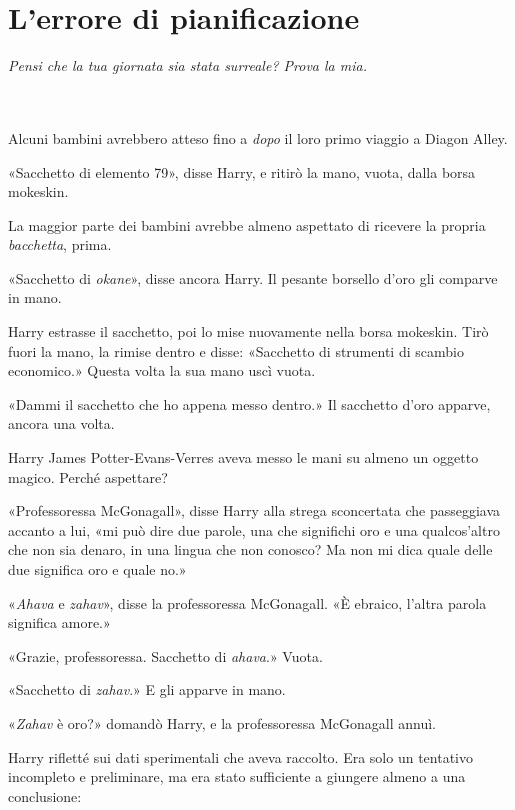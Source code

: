 
\chapter{L’errore di pianificazione}
\label{capitolo:6}

\emph{Pensi che la tua giornata sia stata surreale? Prova la mia.}

~\\
~\\

Alcuni bambini avrebbero atteso fino a \textit{dopo} il loro primo viaggio a Diagon Alley.

«Sacchetto di elemento 79», disse Harry, e ritirò la mano, vuota, dalla borsa mokeskin.

La maggior parte dei bambini avrebbe almeno aspettato di ricevere la propria \textit{bacchetta}, prima.

«Sacchetto di \textit{okane}», disse ancora Harry. Il pesante borsello d’oro gli comparve in mano.

Harry estrasse il sacchetto, poi lo mise nuovamente nella borsa mokeskin. Tirò fuori la mano, la rimise dentro e disse: «Sacchetto di strumenti di scambio economico.» Questa volta la sua mano uscì vuota.

«Dammi il sacchetto che ho appena messo dentro.» Il sacchetto d’oro apparve, ancora una volta.

Harry James Potter-Evans-Verres aveva messo le mani su almeno un oggetto magico. Perché aspettare?

«Professoressa McGonagall», disse Harry alla strega sconcertata che passeggiava accanto a lui, «mi può dire due parole, una che significhi oro e una qualcos’altro che non sia denaro, in una lingua che non conosco? Ma non mi dica quale delle due significa oro e quale no.»

«\textit{Ahava} e \textit{zahav}», disse la professoressa McGonagall. «È ebraico, l’altra parola significa amore.»

«Grazie, professoressa. Sacchetto di \textit{ahava}.» Vuota.

«Sacchetto di \textit{zahav}.» E gli apparve in mano.

«\textit{Zahav} è oro?» domandò Harry, e la professoressa McGonagall annuì.

Harry rifletté sui dati sperimentali che aveva raccolto. Era solo un tentativo incompleto e preliminare, ma era stato sufficiente a giungere almeno a una conclusione:

